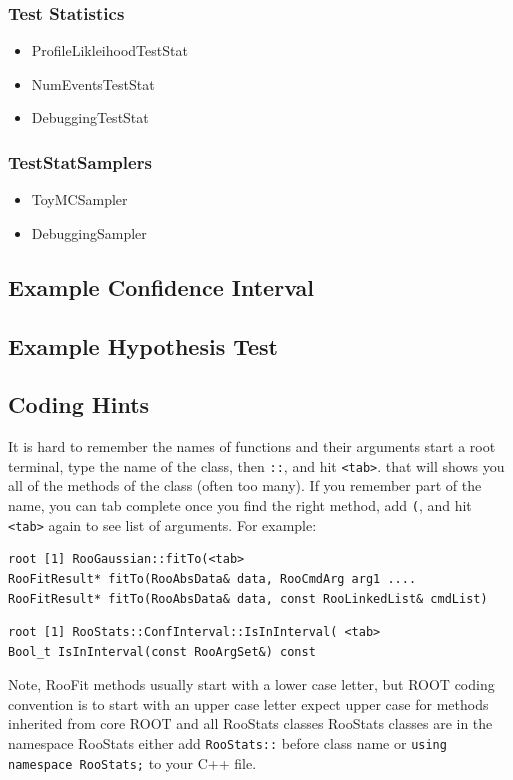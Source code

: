 \documentclass[11pt]{article}
\begin{document}
\subsubsection{Test Statistics}
\begin{itemize}
 \item ProfileLikleihoodTestStat
 \item NumEventsTestStat
 \item DebuggingTestStat
\end{itemize}

\subsubsection{TestStatSamplers}
\begin{itemize}
 \item ToyMCSampler
 \item DebuggingSampler
\end{itemize}

\subsection{Example Confidence Interval}




\subsection{Example Hypothesis Test}

\subsection{Coding Hints}

It is hard to remember the names of functions and their arguments
start a root terminal, type the name of the class, then \texttt{::}, and hit \texttt{<tab>}.  
that will shows you all of the methods of the class (often too many).
If you remember part of the name, you can tab complete
once you find the right method, add \texttt{(}, and hit \texttt{<tab>} again to see list of arguments.  For example:
\begin{lstlisting}[backgroundcolor=\color{shellcommand}]
root [1] RooGaussian::fitTo(<tab>
RooFitResult* fitTo(RooAbsData& data, RooCmdArg arg1 ....
RooFitResult* fitTo(RooAbsData& data, const RooLinkedList& cmdList)
\end{lstlisting}
\begin{lstlisting}[backgroundcolor=\color{shellcommand}]
root [1] RooStats::ConfInterval::IsInInterval( <tab>
Bool_t IsInInterval(const RooArgSet&) const
\end{lstlisting}
Note, RooFit methods usually start with a lower case letter, but ROOT coding convention is to start with an upper case letter
expect upper case for methods inherited from core ROOT and all RooStats classes
RooStats classes are in the namespace RooStats
either add \texttt{RooStats::} before class name or \texttt{using namespace RooStats;} to your C++ file.
\end{document}
